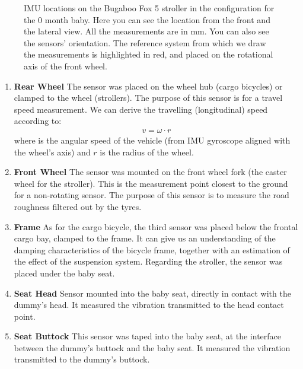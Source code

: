 \documentclass[a4paper]{article}
\begin{document}
%
\begin{figure}
  \centering
  \caption{IMU locations on the Bugaboo Fox 5 stroller in the configuration for
  the 0 month baby. Here you can see the location from the front and the lateral
  view. All the measurements are in \si{\mm}. You can also see the sensors'
  orientation. The reference system from which we draw the measurements is
  highlighted in red, and placed on the rotational axis of the front wheel.}
  \label{fig:tech_drawing_Bugaboo0}
\end{figure}
%
\begin{enumerate}
  \item \textbf{Rear Wheel} The sensor was placed on the wheel hub (cargo
  bicycles) or clamped to the wheel (strollers). The purpose of this sensor is
  for a travel speed measurement. We can derive the travelling (longitudinal)
  speed according to:
  \begin{align}
    v = \si{\omega} \cdot r
    \label{eq:long-speed}
  \end{align}
  where \si{\omega} is the angular speed of the vehicle (from IMU gyroscope aligned with the wheel's axis) and $r$ is the radius of the wheel.
  \item \textbf{Front Wheel} The sensor was mounted on the front wheel fork (the
  caster wheel for the stroller). This is the measurement point closest to the
  ground for a non-rotating sensor. The purpose of this sensor is to measure the
  road roughness filtered out by the tyres.  
  \item \textbf{Frame} As for the cargo bicycle, the third sensor was placed
  below the frontal cargo bay, clamped to the frame. It can give us an
  understanding of the damping characteristics of the bicycle frame, together
  with an estimation of the effect of the suspension system. Regarding the
  stroller, the sensor was placed under the baby seat.
  \item \textbf{Seat Head} Sensor mounted into the baby seat, directly in
  contact with the dummy's head. It measured the vibration transmitted to the
  head contact point.
  \item \textbf{Seat Buttock} This sensor was taped into the baby seat, at the
  interface between the dummy's buttock and the baby seat. It measured the
  vibration transmitted to the dummy's buttock.
\end{enumerate}
\end{document}
